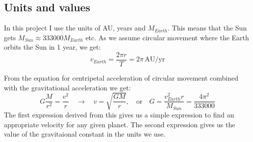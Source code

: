 \documentclass{article} %
\begin{document}
\subsection{Units and values}\label{ss:unva}
In this project I use the units of AU, years and $M_{Earth}$. This means that the Sun gets $M_{Sun}\approx 333000M_{Earth}$ etc. 
As we assume circular movement where the Earth orbits the Sun in 1 year, we get:
\[v_{Earth}=\frac{2\pi r}{T}=2\pi \,\text{AU/yr}\]

From the equation for centripetal acceleration of circular movement combined with the gravitational acceleration we get:
\[
 G\frac{M}{r^2}=\frac{v^2}{r} \quad\rightarrow\quad v=\sqrt{\frac{GM}{r}},\quad \text{or} \quad G=\frac{v_{Earth}^2 r}{M_{Sun}}=\frac{4\pi^2}{333000}
\]
The first expression derived from this gives us a simple expression to find an appropriate velocity for any given planet. The second expression gives
us the value of the gravitaional constant in the units we use.
\end{document}
